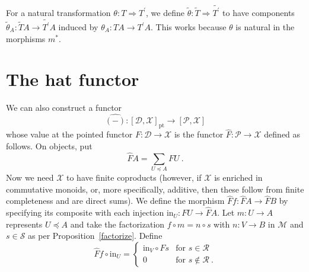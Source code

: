 \documentclass[a4paper,12pt,reqno]{amsart}
\theoremstyle{definition}
\theoremstyle{fact}
\theoremstyle{genquest}
\theoremstyle{step}
\newcommand{\lra}{\longrightarrow}
\newcommand{\ra}{\rightarrow}
\def\CD{{\mathscr D}}
\def\CM{{\mathscr M}}
\def\CP{{\mathscr P}}
\def\CR{{\mathscr R}}
\def\CS{{\mathscr S}}
\def\CX{{\mathscr X}}
\begin{document}
For a natural transformation $\theta : T\Rightarrow T^{\prime}$, we define
$\widetilde{\theta} :\widetilde{T} \Rightarrow \widetilde{T^{\prime}}$
to have components $\widetilde{\theta}_A :\widetilde{T}A \ra \widetilde{T^{\prime}}A$
induced by $\theta_A : TA\ra T^{\prime}A$. This works because $\theta$ is
natural in the morphisms $m^*$.   

\section{The hat functor}\label{hat}

We can also construct a functor
\begin{equation}\label{hat}
\widehat{(-)} : [\CD,\CX]_{\mathrm{pt}} \lra [\CP,\CX]
\end{equation}
whose value at the pointed functor $F : \CD\lra \CX$
is the functor $\widehat{F} : \CP \lra \CX$ defined as follows.   
On objects, put
$$\widehat{F}A = \sum_{U\preceq A}{FU} \ .$$ 
Now we need $\CX$ to have finite coproducts (however, if $\CX$ is
enriched in commutative monoids, or, more specifically, additive, then
these follow from finite completeness and are direct sums). 
We define the morphism $\widehat{F}f: \widehat{F}A \ra \widehat{F}B$
by specifying its composite with each injection $\mathrm{in}_U : FU \ra \widehat{F}A$.
Let $m : U \ra A$ represents $U\preceq A$ and take the factorization 
$f\circ m = n\circ s$ with $n:V\ra B$ in $\CM$ and $s\in \CS$
as per Proposition~\ref{factorize}. 
Define
\begin{equation*}
\widehat{F}f \circ \mathrm{in}_U =
\begin{cases}
\mathrm{in}_V \circ Fs & \text{for }  s \in \CR \\
0 & \text{for } s \notin \CR \ .
\end{cases}
\end{equation*}
\end{document}
